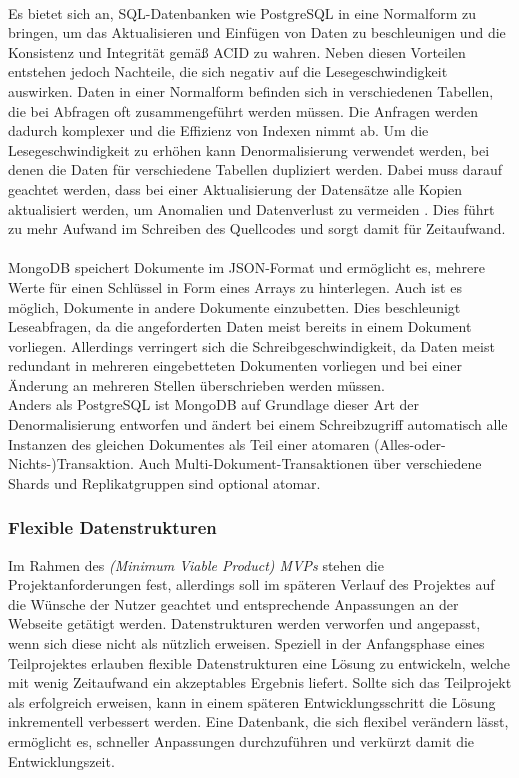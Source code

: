 \paragraph{}
Es bietet sich an, SQL-Datenbanken wie PostgreSQL in eine Normalform zu bringen, um das Aktualisieren und Einfügen von Daten zu beschleunigen und die Konsistenz und Integrität gemäß ACID zu wahren.
Neben diesen Vorteilen entstehen jedoch Nachteile, die sich negativ auf die Lesegeschwindigkeit auswirken.
Daten in einer Normalform befinden sich in verschiedenen Tabellen, die bei Abfragen oft zusammengeführt werden müssen.
Die Anfragen werden dadurch komplexer und die Effizienz von Indexen nimmt ab.
Um die Lesegeschwindigkeit zu erhöhen kann Denormalisierung verwendet werden, bei denen die Daten für verschiedene Tabellen dupliziert werden.
Dabei muss darauf geachtet werden, dass bei einer Aktualisierung der Datensätze alle Kopien aktualisiert werden, um Anomalien und Datenverlust zu vermeiden \cite{db:denormalization}.
Dies führt zu mehr Aufwand im Schreiben des Quellcodes und sorgt damit für Zeitaufwand.


\paragraph{}
MongoDB speichert Dokumente im JSON-Format und ermöglicht es, mehrere Werte für einen Schlüssel in Form eines Arrays zu hinterlegen.
Auch ist es möglich, Dokumente in andere Dokumente einzubetten. \cite{db:mongoEmbeddedDocuments}
Dies beschleunigt Leseabfragen, da die angeforderten Daten meist bereits in einem Dokument vorliegen.
Allerdings verringert sich die Schreibgeschwindigkeit, da Daten meist redundant in mehreren eingebetteten Dokumenten vorliegen und bei einer Änderung an mehreren Stellen überschrieben werden müssen.\\
Anders als PostgreSQL ist MongoDB auf Grundlage dieser Art der Denormalisierung entworfen und ändert bei einem Schreibzugriff automatisch alle Instanzen des gleichen Dokumentes als Teil einer atomaren (Alles-oder-Nichts-)Transaktion.
Auch Multi-Dokument-Transaktionen über verschiedene Shards und Replikatgruppen sind optional atomar. \cite{db:mongoAcidCompliance}

\subsubsection{Flexible Datenstrukturen}
Im Rahmen des \textit{(Minimum Viable Product) MVPs} stehen die Projektanforderungen fest, allerdings soll im späteren Verlauf des Projektes auf die Wünsche der Nutzer geachtet und entsprechende Anpassungen an der Webseite getätigt werden.
Datenstrukturen werden verworfen und angepasst, wenn sich diese nicht als nützlich erweisen.
Speziell in der Anfangsphase eines Teilprojektes erlauben flexible Datenstrukturen eine Lösung zu entwickeln, welche mit wenig Zeitaufwand ein akzeptables Ergebnis liefert.
Sollte sich das Teilprojekt als erfolgreich erweisen, kann in einem späteren Entwicklungsschritt die Lösung inkrementell verbessert werden.
Eine Datenbank, die sich flexibel verändern lässt, ermöglicht es, schneller Anpassungen durchzuführen und verkürzt damit die Entwicklungszeit.

